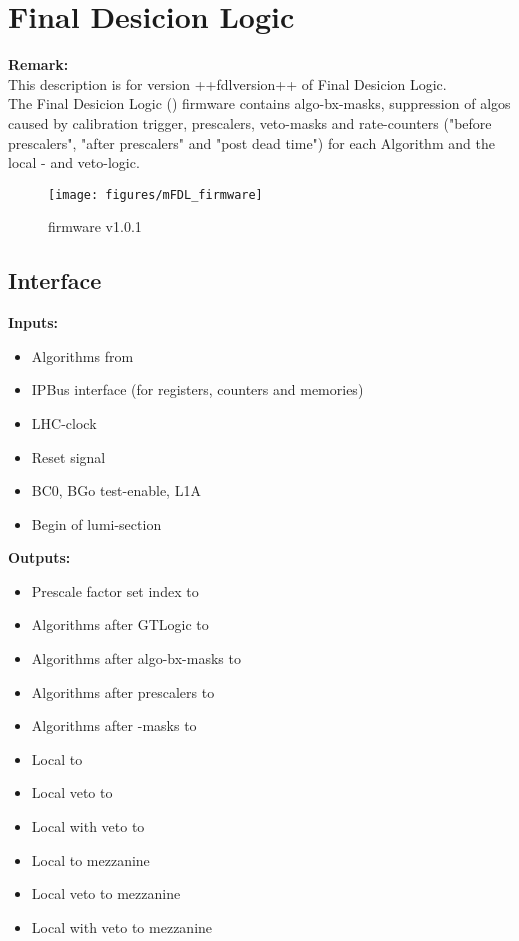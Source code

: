 \section{Final Desicion Logic}\label{sec:fdl:ufdl}

\textbf{Remark:}\\
This description is for version ++fdlversion++ of Final Desicion Logic.\\

The Final Desicion Logic (\ufdl) firmware contains algo-bx-masks, suppression of algos caused by calibration trigger, prescalers, veto-masks and rate-counters
("before prescalers", "after prescalers" and "post dead time") for each Algorithm and the local \finor- and veto-logic.

\begin{figure}[htb]
\centering
\texttt{[image: figures/mFDL\_firmware]}
\caption{\ufdl firmware v1.0.1}
\label{fig:fdl:mFDL_firmware}
\end{figure}

\subsection{\ufdl Interface}
\label{sec:fdl:ufdl_interface}


\textbf{Inputs:}
\begin{itemize}
\item Algorithms from \ugtl
\item IPBus interface (for registers, counters and memories)
\item LHC-clock
\item Reset signal
\item BC0, BGo test-enable, L1A
\item Begin of lumi-section
\end{itemize}
\textbf{Outputs:}
\begin{itemize}
\item Prescale factor set index to \rop
\item Algorithms after GTLogic to \rop
\item Algorithms after algo-bx-masks to \rop
\item Algorithms after prescalers to \rop
\item Algorithms after \finor-masks to \rop
\item Local \finor to \rop
\item Local veto to \rop
\item Local \finor with veto to \rop
\item Local \finor to mezzanine
\item Local veto to mezzanine
\item Local \finor with veto to mezzanine
\end{itemize}

